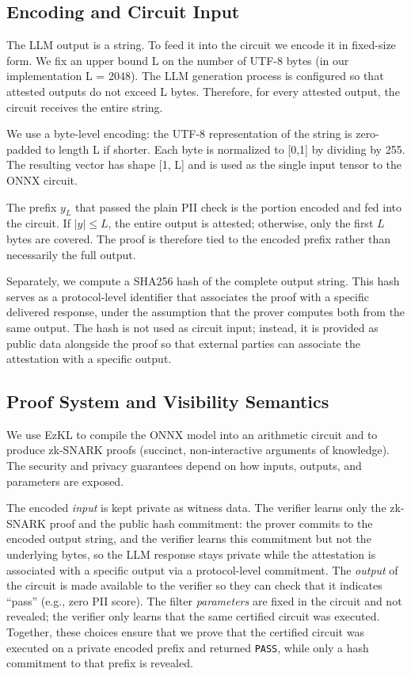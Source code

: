 \documentclass[10pt,conference,a4paper]{IEEEtran}
\begin{document}
\subsection{Encoding and Circuit Input}

The LLM output is a string. To feed it into the circuit we encode it in fixed-size form. We fix an upper bound L on the number of UTF-8 bytes (in our implementation L = 2048). The LLM generation process is configured so that attested outputs do not exceed L bytes. Therefore, for every attested output, the circuit receives the entire string.

We use a byte-level encoding: the UTF-8 representation of the string is zero-padded to length L if shorter. Each byte is normalized to [0,1] by dividing by 255. The resulting vector has shape [1, L] and is used as the single input tensor to the ONNX circuit.

The prefix $y_L$ that passed the plain PII check is the portion encoded and fed into the circuit. If $|y| \le L$, the entire output is attested; otherwise, only the first $L$ bytes are covered. The proof is therefore tied to the encoded prefix rather than necessarily the full output.

Separately, we compute a SHA256 hash of the complete output string. This hash serves as a protocol-level identifier that associates the proof with a specific delivered response, under the assumption that the prover computes both from the same output. The hash is not used as circuit input; instead, it is provided as public data alongside the proof so that external parties can associate the attestation with a specific output.
\subsection{Proof System and Visibility Semantics}

We use EzKL to compile the ONNX model into an arithmetic circuit and to produce zk-SNARK proofs (succinct, non-interactive arguments of knowledge). The security and privacy guarantees depend on how inputs, outputs, and parameters are exposed.

The encoded \emph{input} is kept private as witness data. The verifier learns only the zk-SNARK proof and the public hash commitment: the prover commits to the encoded output string, and the verifier learns this commitment but not the underlying bytes, so the LLM response stays private while the attestation is associated with a specific output via a protocol-level commitment. The \emph{output} of the circuit is made available to the verifier so they can check that it indicates ``pass'' (e.g., zero PII score). The filter \emph{parameters} are fixed in the circuit and not revealed; the verifier only learns that the same certified circuit was executed. Together, these choices ensure that we prove that the certified circuit was executed on a private encoded prefix and returned \texttt{PASS}, while only a hash commitment to that prefix is revealed.
\end{document}
